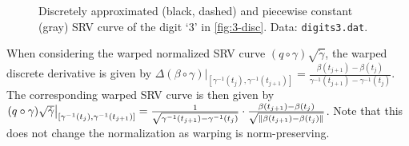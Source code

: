\begin{figure}
  \centering
  \begin{subfigure}{.48\textwidth}
    \centering
  \end{subfigure}\hfill%
  \begin{subfigure}{.48\textwidth}
    \centering
    \begin{subfigure}{\textwidth}
      \centering
    \end{subfigure}
    \begin{subfigure}{\textwidth}
      \centering
    \end{subfigure}
  \end{subfigure}
  \caption{Discretely approximated (black, dashed) and piecewise constant (gray) SRV curve of the digit \enquote*{3} in \cref{fig:3-disc}. Data: \texttt{digits3.dat}.}
  \label{fig:3-disc-srv}
\end{figure}

When considering the warped normalized SRV curve $(q \circ \gamma ) \sqrt{\dot\gamma}$, the warped discrete derivative is given by $\Delta (\beta \circ \gamma) \big\rvert_{[\gamma^{-1}(t_j), \gamma^{-1}(t_{j+1})]} = \frac{\beta(t_{j+1}) - \beta(t_{j})}{\gamma^{-1}(t_{j+1}) - \gamma^{-1}(t_j)}$.
The corresponding warped SRV curve is then given by $(q \circ \gamma) \sqrt{\dot\gamma} \big\rvert_{[\gamma^{-1}(t_j), \gamma^{-1}(t_{j+1})]} = \frac{1}{\sqrt{\gamma^{-1}(t_{j+1}) - \gamma^{-1}(t_j)}} \cdot \frac{\beta(t_{j+1}) - \beta(t_j)}{\sqrt{\lVert\beta(t_{j+1}) - \beta(t_j)\rVert}}$.
Note that this does not change the normalization as warping is norm-preserving.


